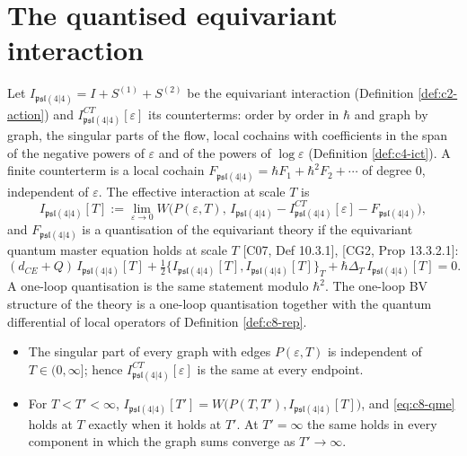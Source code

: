 \section{The quantised equivariant interaction}

\begin{definition}
\label{def:c8-quant}
Let $I_{\mathfrak{psl}(4|4)}=I+S^{(1)}+S^{(2)}$ be the equivariant interaction (Definition \ref{def:c2-action}) and $I^{CT}_{\mathfrak{psl}(4|4)}[\varepsilon]$ its counterterms: order by order in $\hbar$ and graph by graph, the singular parts of the flow, local cochains with coefficients in the span of the negative powers of $\varepsilon$ and of the powers of $\log\varepsilon$ (Definition \ref{def:c4-ict}). A finite counterterm is a local cochain $F_{\mathfrak{psl}(4|4)}=\hbar F_1+\hbar^2F_2+\cdots$ of degree $0$, independent of $\varepsilon$. The effective interaction at scale $T$ is
\begin{equation}
I_{\mathfrak{psl}(4|4)}[T]:=\lim_{\varepsilon\to0}W\big(P(\varepsilon,T),\,I_{\mathfrak{psl}(4|4)}-I^{CT}_{\mathfrak{psl}(4|4)}[\varepsilon]-F_{\mathfrak{psl}(4|4)}\big),
\label{eq:c8-IT}
\end{equation}
and $F_{\mathfrak{psl}(4|4)}$ is a quantisation of the equivariant theory if the equivariant quantum master equation holds at scale $T$ [C07, Def 10.3.1], [CG2, Prop 13.3.2.1]:
\begin{equation}
(d_{CE}+Q)\,I_{\mathfrak{psl}(4|4)}[T]+\tfrac12\big\{I_{\mathfrak{psl}(4|4)}[T],I_{\mathfrak{psl}(4|4)}[T]\big\}_T+\hbar\Delta_T\,I_{\mathfrak{psl}(4|4)}[T]=0 .
\label{eq:c8-qme}
\end{equation}
A one-loop quantisation is the same statement modulo $\hbar^2$. The one-loop BV structure of the theory is a one-loop quantisation together with the quantum differential of local operators of Definition \ref{def:c8-rep}.
\end{definition}

\begin{proposition}
\label{prop:c8-Tindep}
\begin{itemize}
\item[(i)] The singular part of every graph with edges $P(\varepsilon,T)$ is independent of $T\in(0,\infty]$; hence $I^{CT}_{\mathfrak{psl}(4|4)}[\varepsilon]$ is the same at every endpoint.
\item[(ii)] For $T<T'<\infty$, $I_{\mathfrak{psl}(4|4)}[T']=W\big(P(T,T'),I_{\mathfrak{psl}(4|4)}[T]\big)$, and \eqref{eq:c8-qme} holds at $T$ exactly when it holds at $T'$. At $T'=\infty$ the same holds in every component in which the graph sums converge as $T'\to\infty$.
\end{itemize}
\end{proposition}

